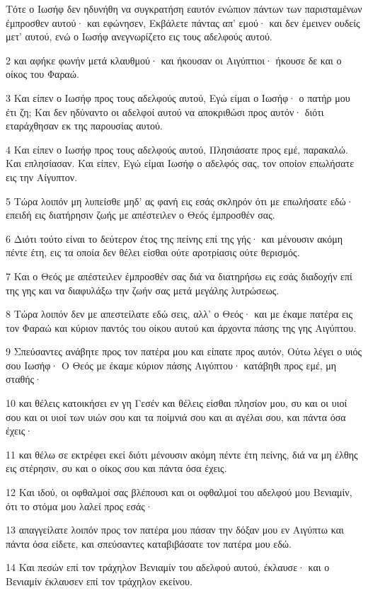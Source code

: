 \par Τότε ο Ιωσήφ δεν ηδυνήθη να συγκρατήση εαυτόν ενώπιον πάντων των παρισταμένων έμπροσθεν αυτού· και εφώνησεν, Εκβάλετε πάντας απ' εμού· και δεν έμεινεν ουδείς μετ' αυτού, ενώ ο Ιωσήφ ανεγνωρίζετο εις τους αδελφούς αυτού.
\par 2 και αφήκε φωνήν μετά κλαυθμού· και ήκουσαν οι Αιγύπτιοι· ήκουσε δε και ο οίκος του Φαραώ.
\par 3 Και είπεν ο Ιωσήφ προς τους αδελφούς αυτού, Εγώ είμαι ο Ιωσήφ· ο πατήρ μου έτι ζη; Και δεν ηδύναντο οι αδελφοί αυτού να αποκριθώσι προς αυτόν· διότι εταράχθησαν εκ της παρουσίας αυτού.
\par 4 Και είπεν ο Ιωσήφ προς τους αδελφούς αυτού, Πλησιάσατε προς εμέ, παρακαλώ. Και επλησίασαν. Και είπεν, Εγώ είμαι Ιωσήφ ο αδελφός σας, τον οποίον επωλήσατε εις την Αίγυπτον.
\par 5 Τώρα λοιπόν μη λυπείσθε μηδ' ας φανή εις εσάς σκληρόν ότι με επωλήσατε εδώ· επειδή εις διατήρησιν ζωής με απέστειλεν ο Θεός έμπροσθέν σας.
\par 6 Διότι τούτο είναι το δεύτερον έτος της πείνης επί της γής· και μένουσιν ακόμη πέντε έτη, εις τα οποία δεν θέλει είσθαι ούτε αροτρίασις ούτε θερισμός.
\par 7 Και ο Θεός με απέστειλεν έμπροσθέν σας διά να διατηρήσω εις εσάς διαδοχήν επί της γης και να διαφυλάξω την ζωήν σας μετά μεγάλης λυτρώσεως.
\par 8 Τώρα λοιπόν δεν με απεστείλατε εδώ σεις, αλλ' ο Θεός· και με έκαμε πατέρα εις τον Φαραώ και κύριον παντός του οίκου αυτού και άρχοντα πάσης της γης Αιγύπτου.
\par 9 Σπεύσαντες ανάβητε προς τον πατέρα μου και είπατε προς αυτόν, Ούτω λέγει ο υιός σου Ιωσήφ· Ο Θεός με έκαμε κύριον πάσης Αιγύπτου· κατάβηθι προς εμέ, μη σταθής·
\par 10 και θέλεις κατοικήσει εν γη Γεσέν και θέλεις είσθαι πλησίον μου, συ και οι υιοί σου και οι υιοί των υιών σου και τα ποίμνιά σου και αι αγέλαι σου, και πάντα όσα έχεις·
\par 11 και θέλω σε εκτρέφει εκεί διότι μένουσιν ακόμη πέντε έτη πείνης, διά να μη έλθης εις στέρησιν, συ και ο οίκος σου και πάντα όσα έχεις.
\par 12 Και ιδού, οι οφθαλμοί σας βλέπουσι και οι οφθαλμοί του αδελφού μου Βενιαμίν, ότι το στόμα μου λαλεί προς εσάς·
\par 13 απαγγείλατε λοιπόν προς τον πατέρα μου πάσαν την δόξαν μου εν Αιγύπτω και πάντα όσα είδετε, και σπεύσαντες καταβιβάσατε τον πατέρα μου εδώ.
\par 14 Και πεσών επί τον τράχηλον Βενιαμίν του αδελφού αυτού, έκλαυσε· και ο Βενιαμίν έκλαυσεν επί τον τράχηλον εκείνου.
